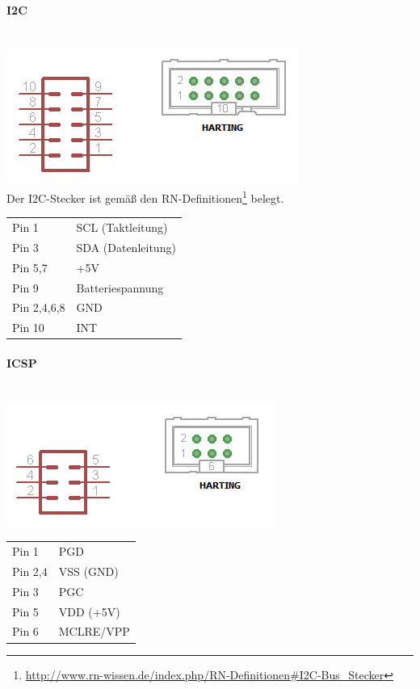 \documentclass[a4paper,10pt]{article}
\begin{document}
\paragraph{I2C} \mbox{} \\
\includegraphics[scale=0.6]{connector_i2c} \\
Der I2C-Stecker ist gemäß den RN-Definitionen\footnote{\url{http://www.rn-wissen.de/index.php/RN-Definitionen\#I2C-Bus_Stecker}} belegt.
\begin{center}
    \begin{tabular}{| l | l |}
    \hline
    Pin 1 	& SCL (Taktleitung) \\ 
    Pin 3	& SDA (Datenleitung) \\
    Pin 5,7 	& +5V \\ 
    Pin 9 	& Batteriespannung \\ 
    Pin 2,4,6,8	& GND \\
    Pin 10 	& INT \\ \hline
    \end{tabular}
\end{center}

\paragraph{ICSP} \mbox{} \\
\includegraphics[scale=0.6]{connector_icsp} 
\begin{center}
    \begin{tabular}{| l | l |}
    \hline
    Pin 1 	& PGD \\ 
    Pin 2,4	& VSS (GND) \\
    Pin 3 	& PGC \\ 
    Pin 5 	& VDD (+5V) \\ 
    Pin 6	& MCLRE/VPP \\ \hline
    \end{tabular}
\end{center}
\end{document}
